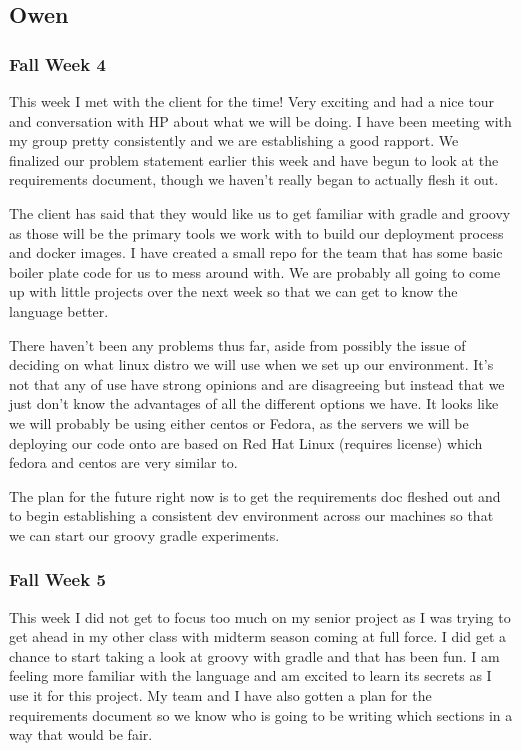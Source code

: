 \documentclass[onecolumn, draftclsnofoot,10pt, compsoc]{IEEEtran}
\begin{document}
\subsection{Owen}
\subsubsection*{Fall Week 4}
This week I met with the client for the time! Very exciting and had a nice tour and conversation with HP about what we will be doing. I have been meeting with my group pretty consistently and we are establishing a good rapport. We finalized our problem statement earlier this week and have begun to look at the requirements document, though we haven't really began to actually flesh it out.

The client has said that they would like us to get familiar with gradle and groovy as those will be the primary tools we work with to build our deployment process and docker images. I have created a small repo for the team that has some basic boiler plate code for us to mess around with. We are probably all going to come up with little projects over the next week so that we can get to know the language better.

There haven't been any problems thus far, aside from possibly the issue of deciding on what linux distro we will use when we set up our environment. It's not that any of use have strong opinions and are disagreeing but instead that we just don't know the advantages of all the different options we have. It looks like we will probably be using either centos or Fedora, as the servers we will be deploying our code onto are based on Red Hat Linux (requires license) which fedora and centos are very similar to.

 

The plan for the future right now is to get the requirements doc fleshed out and to begin establishing a consistent dev environment across our machines so that we can start our groovy gradle experiments.

\subsubsection*{Fall Week 5}
This week I did not get to focus too much on my senior project as I was trying to get ahead in my other class with midterm season coming at full force. I did get a chance to start taking a look at groovy with gradle and that has been fun. I am feeling more familiar with the language and am excited to learn its secrets as I use it for this project. My team and I have also gotten a plan for the requirements document so we know who is going to be writing which sections in a way that would be fair.
\end{document}
